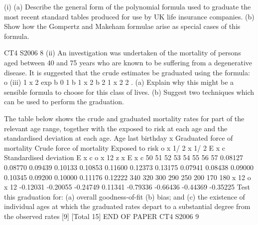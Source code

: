 \documentclass[a4paper,12pt]{article}
\begin{document}
(i) (a)
Describe the general form of the polynomial formula used to graduate
the most recent standard tables produced for use by UK life insurance
companies.
(b)
Show how the Gompertz and Makeham formulae arise as special cases
of this formula.

CT4 S2006
8
(ii)
An investigation was undertaken of the mortality of persons aged between 40
and 75 years who are known to be suffering from a degenerative disease. It is
suggested that the crude estimates be graduated using the formula:
o
(iii)
1
x
2
exp b 0
1
b 1 x
2
b 2
1
x
2
2
.
(a) Explain why this might be a sensible formula to choose for this class of
lives.
(b) Suggest two techniques which can be used to perform the graduation.

The table below shows the crude and graduated mortality rates for part of the
relevant age range, together with the exposed to risk at each age and the
standardised deviation at each age.
Age last
birthday
x
Graduated
force of
mortality
Crude
force of
mortality
Exposed
to risk
o
x 1/ 2
x 1/ 2
E x c
Standardised deviation
E x c
o
x 12
z x
E x c
50
51
52
53
54
55
56
57
0.08127
0.08770
0.09439
0.10133
0.10853
0.11600
0.12373
0.13175
0.07941
0.08438
0.09000
0.10345
0.09200
0.10000
0.11176
0.12222
340
320
300
290
250
200
170
180
x 12
o
x 12
-0.12031
-0.20055
-0.24749
0.11341
-0.79336
-0.66436
-0.44369
-0.35225
Test this graduation for:
(a) overall goodness-of-fit
(b) bias; and
(c) the existence of individual ages at which the graduated rates depart to a
substantial degree from the observed rates
[9]
[Total 15]
END OF PAPER
CT4 S2006
9
\end{document}
